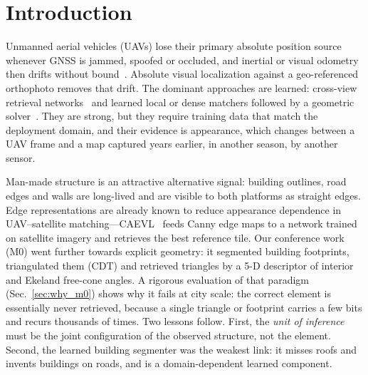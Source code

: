 \section{Introduction}
\label{sec:intro}

Unmanned aerial vehicles (UAVs) lose their primary absolute position source
whenever GNSS is jammed, spoofed or occluded, and inertial or visual odometry
then drifts without bound~\cite{couturier2021review}. Absolute visual
localization against a geo-referenced orthophoto removes that drift. The
dominant approaches are learned: cross-view retrieval
networks~\cite{zhu2022transgeo,wu2024camp,wu2025uavgeoloc,ji2025game4loc} and
learned local or dense matchers followed by a geometric
solver~\cite{lindenberger2023lightglue,edstedt2024roma,deng2026airlock,ye2026anyvisloc}.
They are strong, but they require training data that match the deployment
domain, and their evidence is appearance, which changes between a UAV frame and
a map captured years earlier, in another season, by another sensor.

Man-made structure is an attractive alternative signal: building outlines,
road edges and walls are long-lived and are visible to both platforms as
straight edges. Edge representations are already known to reduce appearance
dependence in UAV--satellite matching---CAEVL~\cite{amadei2026caevl} feeds
Canny edge maps to a network trained on satellite imagery and retrieves the
best reference tile. Our conference work (M0) went further towards explicit
geometry: it segmented building footprints, triangulated them (CDT) and
retrieved triangles by a 5-D descriptor of interior and Ekeland free-cone
angles. A rigorous evaluation of that paradigm (Sec.~\ref{sec:why_m0}) shows
why it fails at city scale: the correct element is essentially never retrieved,
because a single triangle or footprint carries a few bits and recurs thousands
of times. Two lessons follow. First, the \emph{unit of inference} must be the
joint configuration of the observed structure, not the element. Second, the
learned building segmenter was the weakest link: it misses roofs and invents
buildings on roads, and is a domain-dependent learned component.

